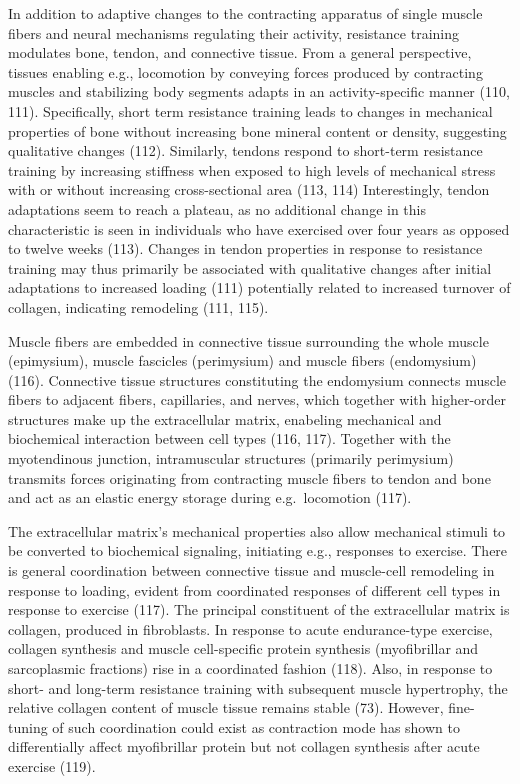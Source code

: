 \documentclass[twoside,10pt]{gihclass} %
\begin{document}
In addition to adaptive changes to the contracting apparatus of single muscle fibers and neural mechanisms regulating their activity, resistance training modulates bone, tendon, and connective tissue.
From a general perspective, tissues enabling e.g., locomotion by conveying forces produced by contracting muscles and stabilizing body segments adapts in an activity-specific manner
(110, 111).
Specifically, short term resistance training leads to changes in mechanical properties of bone without increasing bone mineral content or density, suggesting qualitative changes
(112).
Similarly, tendons respond to short-term resistance training by increasing stiffness when exposed to high levels of mechanical stress with or without increasing cross-sectional area
(113, 114)
Interestingly, tendon adaptations seem to reach a plateau, as no additional change in this characteristic is seen in individuals who have exercised over four years as opposed to twelve weeks
(113).
Changes in tendon properties in response to resistance training may thus primarily be associated with qualitative changes after initial adaptations to increased loading
(111)
potentially related to increased turnover of collagen, indicating remodeling
(111, 115).

Muscle fibers are embedded in connective tissue surrounding the whole muscle (epimysium), muscle fascicles (perimysium) and muscle fibers (endomysium)
(116).
Connective tissue structures constituting the endomysium connects muscle fibers to adjacent fibers, capillaries, and nerves, which together with higher-order structures make up the extracellular matrix, enabeling mechanical and biochemical interaction between cell types
(116, 117).
Together with the myotendinous junction, intramuscular structures (primarily perimysium) transmits forces originating from contracting muscle fibers to tendon and bone and act as an elastic energy storage during e.g.~locomotion
(117).

The extracellular matrix's mechanical properties also allow mechanical stimuli to be converted to biochemical signaling, initiating e.g., responses to exercise.
There is general coordination between connective tissue and muscle-cell remodeling in response to loading, evident from coordinated responses of different cell types in response to exercise
(117).
The principal constituent of the extracellular matrix is collagen, produced in fibroblasts.
In response to acute endurance-type exercise, collagen synthesis and muscle cell-specific protein synthesis (myofibrillar and sarcoplasmic fractions) rise in a coordinated fashion
(118).
Also, in response to short- and long-term resistance training with subsequent muscle hypertrophy, the relative collagen content of muscle tissue remains stable
(73).
However, fine-tuning of such coordination could exist as contraction mode has shown to differentially affect myofibrillar protein but not collagen synthesis after acute exercise
(119).
\end{document}
